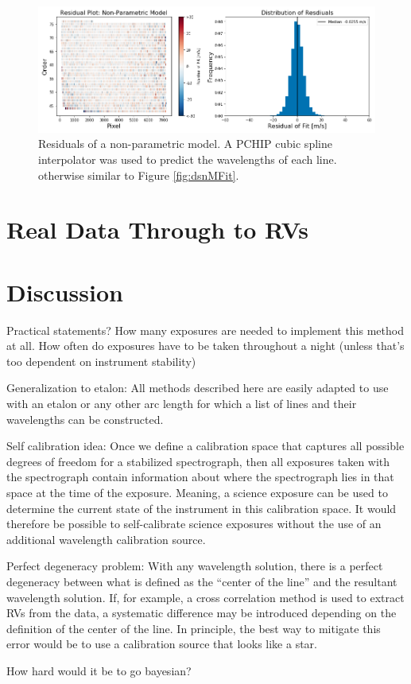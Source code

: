 \documentclass[12pt, letterpaper]{article}
\begin{document}
\begin{figure}[h]
\centering
\includegraphics[width=\textwidth]{Figures/noHierc.png}
\caption{Residuals of a non-parametric model.  A PCHIP cubic spline interpolator was used to predict the wavelengths of each line.  otherwise similar to Figure \ref{fig:dsnMFit}.}
\label{fig:intpFit}
\end{figure} 

\section{Real Data Through to RVs} \label{sec:realdata}

\section{Discussion} \label{sec:discussion}

Practical statements?  How many exposures are needed to implement this method at all.  How often do exposures have to be taken throughout a night (unless that's too dependent on instrument stability)

Generalization to etalon:
All methods described here are easily adapted to use with an etalon or any other arc length for which a list of lines and their wavelengths can be constructed.

Self calibration idea:
Once we define a calibration space that captures all possible degrees of freedom for a stabilized spectrograph, then all exposures taken with the spectrograph contain information about where the spectrograph lies in that space at the time of the exposure.  Meaning, a science exposure can be used to determine the current state of the instrument in this calibration space.  It would therefore be possible to self-calibrate science exposures without the use of an additional wavelength calibration source.

Perfect degeneracy problem:
With any wavelength solution, there is a perfect degeneracy between what is defined as the ``center of the line'' and the resultant wavelength solution.  If, for example, a cross correlation method is used to extract RVs from the data, a systematic difference may be introduced depending on the definition of the center of the line.  In principle, the best way to mitigate this error would be to use a calibration source that looks like a star.


How hard would it be to go bayesian?
\end{document}
